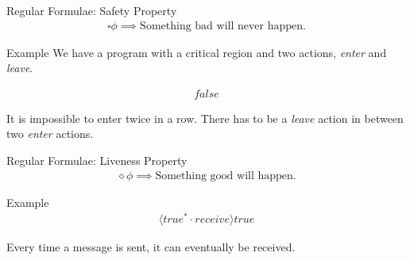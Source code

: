\documentclass[aspectratio=1610]{beamer}
\begin{document}
  \begin{frame}{Regular Formulae: Safety Property}
    \begin{align*}
      \square\phi \implies \text{Something bad will never happen.}
    \end{align*}

    \begin{exampleblock}{Example}
      We have a program with a critical region and two actions, \textit{enter} and \textit{leave}.

      \begin{align*}
        [true^*\cdot enter \cdot \overline{leave}^* \cdot enter]false
      \end{align*}

      It is impossible to enter twice in a row. There has to be a \textit{leave} action in between two \textit{enter} actions.
    \end{exampleblock}
  \end{frame}

  \begin{frame}{Regular Formulae: Liveness Property}
    \begin{align*}
      \diamond\phi \implies \text{Something good will happen.}
    \end{align*}

    \begin{exampleblock}{Example}
      \begin{align*}
        [true^*\cdot send]\langle true^* \cdot receive \rangle true
      \end{align*}

      Every time a message is sent, it can eventually be received.
    \end{exampleblock}
  \end{frame}
\end{document}
